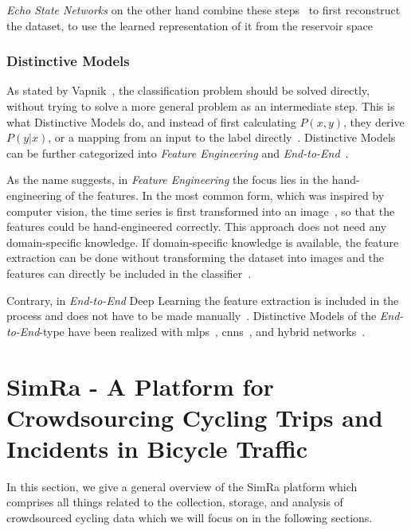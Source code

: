 \textit{Echo State Networks} on the other hand combine these steps~\cite{jaeger2001echo} to first reconstruct the dataset, to use the learned representation of it from the reservoir space~\cite{aswolinskiy2018time,bianchi2020reservoir,chouikhi2018genesis,ma2016functional}

\subsubsection*{Distinctive Models}
As stated by Vapnik~\cite{vapnik1998statistical}, the classification problem should be solved directly, without trying to solve a more general problem as an intermediate step.
This is what Distinctive Models do, and instead of first calculating $P(x,y)$, they derive $P(y|x)$, or a mapping from an input to the label directly~\cite{ng2001discriminative}.
Distinctive Models can be further categorized into \textit{Feature Engineering} and \textit{End-to-End}~\cite{ismail2019deep}.

As the name suggests, in \textit{Feature Engineering} the focus lies in the hand-engineering of the features.
In the most common form, which was inspired by computer vision, the time series is first transformed into an image~\cite{wang2015encoding,hatami2018classification,tripathy2018use}, so that the features could be hand-engineered correctly.
This approach does not need any domain-specific knowledge.
If domain-specific knowledge is available, the feature extraction can be done without transforming the dataset into images and the features can directly be included in the classifier~\cite{uemura2018feasibility,ignatov2018real}.

Contrary, in \textit{End-to-End} Deep Learning the feature extraction is included in the process and does not have to be made manually~\cite{nweke2018deep}.
Distinctive Models of the \textit{End-to-End}-type have been realized with \acp{mlp}~\cite{wang2017time,geng2019cost}, \acp{cnn}~\cite{che2017boosting,ismail2018evaluating,liu2018time}, and hybrid networks~\cite{lin2017gcrnn,serra2018towards}.


\section{SimRa - A Platform for Crowdsourcing Cycling Trips and Incidents in Bicycle Traffic}
\label{sec:simra}
In this section, we give a general overview of the SimRa platform which comprises all things related to the collection, storage, and analysis of crowdsourced cycling data which we will focus on in the following sections.

